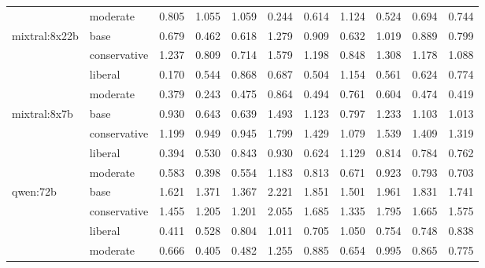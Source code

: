 \begin{table}
\begin{tabular}{llrrrrrrrrr}
 & moderate & 0.805 & 1.055 & 1.059 & 0.244 & 0.614 & 1.124 & 0.524 & 0.694 & 0.744 \\
\cline{1-11}
\multirow[t]{4}{*}{mixtral:8x22b} & base & 0.679 & 0.462 & 0.618 & 1.279 & 0.909 & 0.632 & 1.019 & 0.889 & 0.799 \\
 & conservative & 1.237 & 0.809 & 0.714 & 1.579 & 1.198 & 0.848 & 1.308 & 1.178 & 1.088 \\
 & liberal & 0.170 & 0.544 & 0.868 & 0.687 & 0.504 & 1.154 & 0.561 & 0.624 & 0.774 \\
 & moderate & 0.379 & 0.243 & 0.475 & 0.864 & 0.494 & 0.761 & 0.604 & 0.474 & 0.419 \\
\cline{1-11}
\multirow[t]{4}{*}{mixtral:8x7b} & base & 0.930 & 0.643 & 0.639 & 1.493 & 1.123 & 0.797 & 1.233 & 1.103 & 1.013 \\
 & conservative & 1.199 & 0.949 & 0.945 & 1.799 & 1.429 & 1.079 & 1.539 & 1.409 & 1.319 \\
 & liberal & 0.394 & 0.530 & 0.843 & 0.930 & 0.624 & 1.129 & 0.814 & 0.784 & 0.762 \\
 & moderate & 0.583 & 0.398 & 0.554 & 1.183 & 0.813 & 0.671 & 0.923 & 0.793 & 0.703 \\
\cline{1-11}
\multirow[t]{4}{*}{qwen:72b} & base & 1.621 & 1.371 & 1.367 & 2.221 & 1.851 & 1.501 & 1.961 & 1.831 & 1.741 \\
 & conservative & 1.455 & 1.205 & 1.201 & 2.055 & 1.685 & 1.335 & 1.795 & 1.665 & 1.575 \\
 & liberal & 0.411 & 0.528 & 0.804 & 1.011 & 0.705 & 1.050 & 0.754 & 0.748 & 0.838 \\
 & moderate & 0.666 & 0.405 & 0.482 & 1.255 & 0.885 & 0.654 & 0.995 & 0.865 & 0.775 \\
\cline{1-11}
\bottomrule
\end{tabular}
\end{table}
